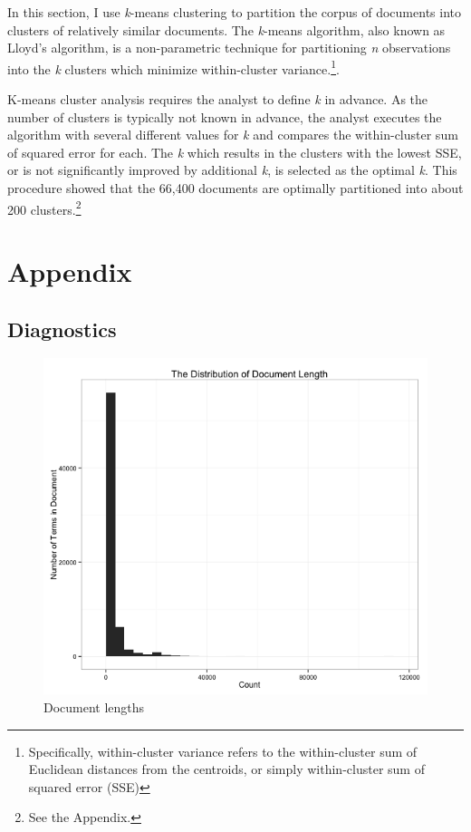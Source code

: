 \documentclass[11pt,article,oneside]{memoir}
\makeatletter
\def\maxwidth{\ifdim\Gin@nat@width>\linewidth\linewidth
\else\Gin@nat@width\fi}
\let\Oldincludegraphics\includegraphics
\renewcommand{\includegraphics}[1]{\Oldincludegraphics[width=\maxwidth]{#1}}
\makeatother
\begin{document}
In this section, I use \emph{k}-means clustering to partition the corpus
of documents into clusters of relatively similar documents. The
\emph{k}-means algorithm, also known as Lloyd's algorithm, is a
non-parametric technique for partitioning \emph{n} observations into the
\emph{k} clusters which minimize within-cluster variance.\footnote{Specifically,
  within-cluster variance refers to the within-cluster sum of Euclidean
  distances from the centroids, or simply within-cluster sum of squared
  error (SSE)}.

K-means cluster analysis requires the analyst to define \emph{k} in
advance. As the number of clusters is typically not known in advance,
the analyst executes the algorithm with several different values for
\emph{k} and compares the within-cluster sum of squared error for each.
The \emph{k} which results in the clusters with the lowest SSE, or is
not significantly improved by additional \emph{k}, is selected as the
optimal \emph{k}. This procedure showed that the 66,400 documents are
optimally partitioned into about 200 clusters.\footnote{See the
  Appendix.}

\pagebreak

\section{Appendix}\label{appendix}

\subsection{Diagnostics}\label{diagnostics}

\begin{figure}[htbp]
\centering
\includegraphics{figure/Document-Lengths.png}
\caption{Document lengths}
\end{figure}
\end{document}
